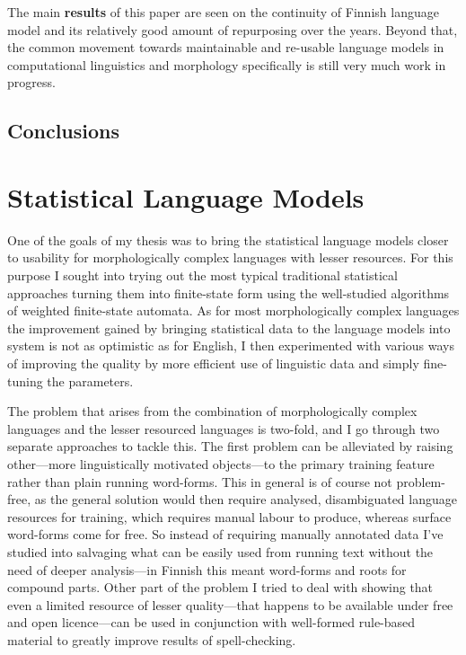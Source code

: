 \documentclass[officiallayout,draft]{unihelcompling}
\begin{document}
The main \textbf{results} of this paper are seen on the continuity of Finnish
language model and its relatively good amount of repurposing over the years.
Beyond that, the common movement towards maintainable and re-usable language
models in computational linguistics and morphology specifically is still very
much work in progress.

\section{Conclusions}



\chapter{Statistical Language Models}
\label{chap:statistical-models}

One of the goals of my thesis was to bring the statistical language models
closer to usability for morphologically complex languages with lesser
resources. For this purpose I sought into trying out the most typical
traditional statistical approaches turning them into finite-state form
using the well-studied algorithms of weighted finite-state automata. As for
most morphologically complex languages the improvement gained by bringing
statistical data to the language models into system is not as optimistic as
for English, I then experimented with various ways of improving the quality
by more efficient use of linguistic data and simply fine-tuning the parameters.

The problem that arises from the combination of morphologically complex 
languages and the lesser resourced languages is two-fold, and I go through two
separate approaches to tackle this. The first problem can be alleviated by
raising other---more linguistically motivated objects---to the primary training
feature rather than plain running word-forms. This in general is of course not
problem-free, as the general solution would then require analysed, 
disambiguated language resources for training, which requires manual labour to
produce, whereas surface word-forms come for free. So instead of requiring
manually annotated data I've studied into salvaging what can be easily used
from running text without the need of deeper analysis---in Finnish this meant
word-forms and roots for compound parts. Other part of the problem I tried to
deal with showing that even a limited resource of lesser quality---that
happens to be available under free and open licence---can be used
in conjunction with well-formed rule-based material to greatly improve results
of spell-checking.
\end{document}
